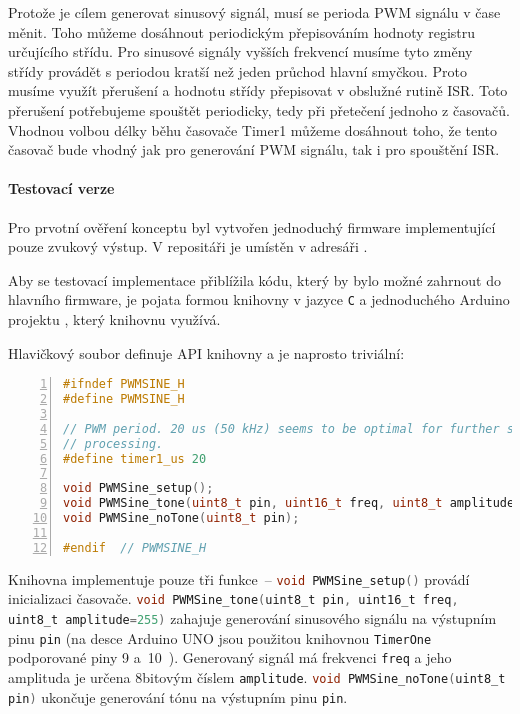 Protože je cílem generovat sinusový signál, musí se perioda PWM signálu v čase
měnit. Toho můžeme dosáhnout periodickým přepisováním hodnoty registru
určujícího střídu. Pro sinusové signály vyšších frekvencí musíme tyto změny
střídy provádět s periodou kratší než jeden průchod hlavní smyčkou. Proto
musíme využít přerušení a hodnotu střídy přepisovat v obslužné rutině ISR.
Toto přerušení potřebujeme spouštět periodicky, tedy při přetečení jednoho
z časovačů. Vhodnou volbou délky běhu časovače Timer1 můžeme dosáhnout toho, že
tento časovač bude vhodný jak pro generování PWM signálu, tak i pro spouštění
ISR.

\paragraph{Testovací verze}
Pro prvotní ověření konceptu byl vytvořen jednoduchý firmware implementující
pouze zvukový výstup. V repositáři  je umístěn v adresáři
.  %

Aby se testovací implementace přiblížila kódu, který by bylo možné zahrnout do
hlavního firmware, je pojata formou knihovny v jazyce \texttt{C} a jednoduchého
Arduino projektu , který knihovnu využívá.

Hlavičkový soubor  definuje API knihovny a je naprosto
triviální:
\begin{lstlisting}[language=C++,numbers=left]
#ifndef PWMSINE_H
#define PWMSINE_H

// PWM period. 20 us (50 kHz) seems to be optimal for further signal
// processing.
#define timer1_us 20

void PWMSine_setup();
void PWMSine_tone(uint8_t pin, uint16_t freq, uint8_t amplitude=255);
void PWMSine_noTone(uint8_t pin);

#endif  // PWMSINE_H
\end{lstlisting}

Knihovna implementuje pouze tři funkce~--
\lstinline[language=C]!void PWMSine_setup()! provádí inicializaci časovače.
\lstinline[language=C]!void PWMSine_tone(uint8_t pin, uint16_t freq, uint8_t amplitude=255)!
zahajuje generování sinusového signálu na výstupním pinu \texttt{pin} (na desce
Arduino UNO jsou použitou knihovnou \texttt{TimerOne} podporované piny 9
a~10~\cite{TimerOnedocs}). Generovaný signál má frekvenci \texttt{freq} a jeho
amplituda je určena 8bitovým číslem \texttt{amplitude}.
\lstinline[language=C]!void PWMSine_noTone(uint8_t pin)! ukončuje generování
tónu na výstupním pinu \texttt{pin}.

